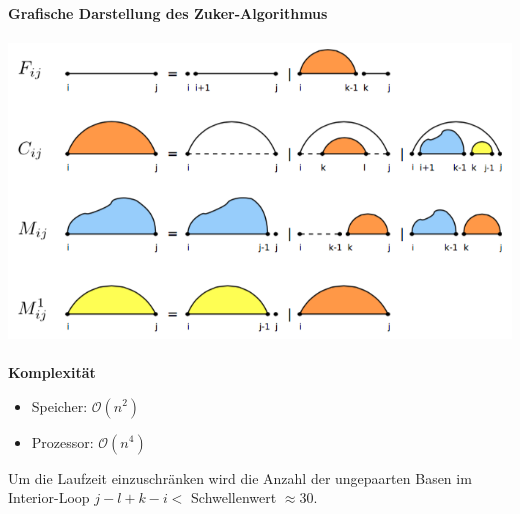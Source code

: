 \paragraph{}
 \textbf{Grafische Darstellung des Zuker-Algorithmus}\\\\
\includegraphics[scale=0.55]{lectures/160404_2/pix/zuker_lorenz}\\
\paragraph{}
 \textbf{Komplexit\"at}
\begin{itemize}
	\item[] Speicher: $\mathcal{O}(n^2)$
	\item[] Prozessor: $\mathcal{O}(n^4)$
\end{itemize}
Um die Laufzeit einzuschr\"anken wird die Anzahl der ungepaarten Basen im Interior-Loop $j-l+k-i<$ Schwellenwert $\approx 30$.